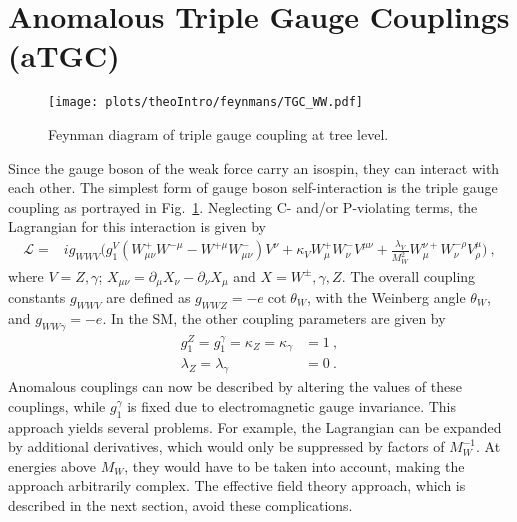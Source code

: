 \section{Anomalous Triple Gauge Couplings (aTGC)}
\label{sec:aTGC}
\begin{figure}[b]
	\centering
	\texttt{[image: plots/theoIntro/feynmans/TGC\_WW.pdf]}
	\caption[Feynman diagram of triple gauge coupling at tree level.]{Feynman diagram of triple gauge coupling at tree level.}
	\label{fig:theo:tgc}
\end{figure}
Since the gauge boson of the weak force carry an isospin, they can interact with each other. The simplest form of gauge boson self-interaction is the triple gauge coupling as portrayed in Fig.~\ref{fig:theo:tgc}. Neglecting C- and/or P-violating terms, the Lagrangian for this interaction is given by \cite{EFT}
\begin{align}
\mathcal{L} =& ig_{WWV}\Big( g_1^V(W_{\mu\nu}^+W^{-\mu} - W^{+\mu}W_{\mu\nu}^-)V^{\nu} + \kappa_VW_\mu^+W_\nu^-V^{\mu\nu}  + \frac{\lambda_V}{M_W^2}W_\mu^{\nu+}W_\nu^{-\rho}V_\rho^\mu  \Big) ~,
\end{align}
where $V=Z,\gamma$; $X_{\mu\nu}=\partial_\mu X_\nu -\partial_\nu X_\mu$ and $X=W^\pm,\gamma ,Z$. The overall coupling constants $g_{WWV}$ are defined as $g_{WWZ} = -e \cot \theta_W$, with the Weinberg angle $\theta_W$, and  $g_{WW\gamma} =-e$. In the SM, the other coupling parameters are given by
\begin{align}
g_1^Z = g_1^\gamma = \kappa_Z = \kappa_\gamma &= 1 ~, \\
\lambda_Z = \lambda_\gamma &= 0 ~.
\end{align}
Anomalous couplings can now be described by altering the values of these couplings, while $g_1^\gamma$ is fixed due to electromagnetic gauge invariance. This approach yields several problems. For example, the Lagrangian can be expanded by additional derivatives, which would only be suppressed by factors of $M_W^{-1}$. At energies above $M_W$, they would have to be taken into account, making the approach arbitrarily complex. The effective field theory approach, which is described in the next section, avoid these complications.\\ 
